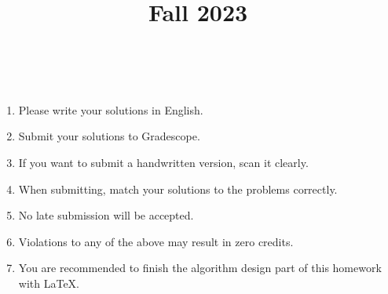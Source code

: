 \documentclass[11pt, addpoints, answers]{exam}
\title{
    \CourseName\\
    Fall 2023\\
    \HomeworkNO\\
}
\author{}
\date{\DueDate}
\begin{document}
\maketitle

\begin{enumerate}
    \item Please write your solutions in English.
    \item Submit your solutions to Gradescope.
    \item If you want to submit a handwritten version, scan it clearly.
    \item When submitting, match your solutions to the problems correctly.
    \item No late submission will be accepted.
    \item Violations to any of the above may result in zero credits.
    \item You are recommended to finish the algorithm design part of this homework with \LaTeX.
\end{enumerate}

\newpage

\begin{questions}

    \newpage
    
    
    
    \newpage
    
    
    
    \newpage

    

    \newpage
    
    
    
    \newpage
    
    
    
    \newpage
    
    
    
\end{questions}
\end{document}
